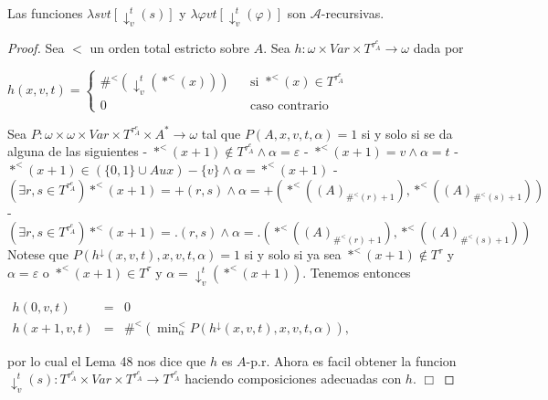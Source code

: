   \begin{lemma} \label{lemma_100}
    \PN Las funciones $\lambda svt[\downarrow_{v}^{t}(s)]$ y $\lambda \varphi vt[\downarrow_{v}^{t}(\varphi)]$ son
    $\mathcal{A}$-recursivas.
  \end{lemma}
  \begin{proof}
    Sea $< $ un orden total estricto sobre $A$. Sea $h:\omega \times Var\times T^{\tau_{A}^{e}}\rightarrow \omega $ dada por

    $\displaystyle h(x,v,t)=\left\{ \begin{array}{ccc} \#^{< }(\downarrow _{v}^{t}(\ast ^{< }(x))) & & \text{si }\ast ^{< }(x)\in T^{\tau_{A}^{e}} \\ 0 & & \text{caso contrario} \end{array} \right. $

    Sea $P:\omega \times \omega \times Var\times T^{\tau_{A}^{e}}\times A^{\ast }\rightarrow \omega $ tal que $P(A,x,v,t,\alpha )=1$ si y solo si se da alguna de las siguientes
    - $\ast ^{< }(x+1)\notin T^{\tau_{A}^{e}}\wedge \alpha =\varepsilon $
    - $\ast ^{< }(x+1)=v\wedge \alpha =t$
    - $\ast ^{< }(x+1)\in (\{0,1\}\cup Aux)-\{v\}\wedge \alpha =\ast ^{< }(x+1)$
    - $(\exists r,s\in T^{\tau_{A}^{e}})\ast ^{< }(x+1)=+(r,s)\wedge \alpha =+(\ast ^{< }((A)_{\#^{< }(r)+1}),\ast ^{< }((A)_{\#^{< }(s)+1}))$
    - $(\exists r,s\in T^{\tau_{A}^{e}})\ast ^{< }(x+1)=\mathrm{.} (r,s)\wedge \alpha =\mathrm{.}(\ast ^{< }((A)_{\#^{< }(r)+1}),\ast ^{< }((A)_{\#^{< }(s)+1}))$
    Notese que $P(h^{\downarrow }(x,v,t),x,v,t,\alpha )=1$ si y solo si ya sea $\ast ^{< }(x+1)\notin T^{\tau }$ y $\alpha =\varepsilon $ o $\ast ^{< }(x+1)\in T^{\tau }$ y $\alpha =\mathrm{\downarrow }_{v}^{t}(\ast ^{< }(x+1))$. Tenemos entonces

    $\displaystyle \begin{array}{rcl} h(0,v,t) & =& 0 \\ h(x+1,v,t) & =& \#^{< }(\min_{\alpha }^{< }P(h^{\downarrow }(x,v,t),x,v,t,\alpha )), \end{array} $

    por lo cual el Lema 48 nos dice que $h$ es $A$-p.r. Ahora es facil obtener la funcion $\downarrow _{v}^{t}(s):T^{\tau_{A}^{e}}\times Var\times T^{\tau_{A}^{e}}\rightarrow T^{\tau_{A}^{e}}$ haciendo composiciones adecuadas con $h$. $\Box$
  \end{proof}

